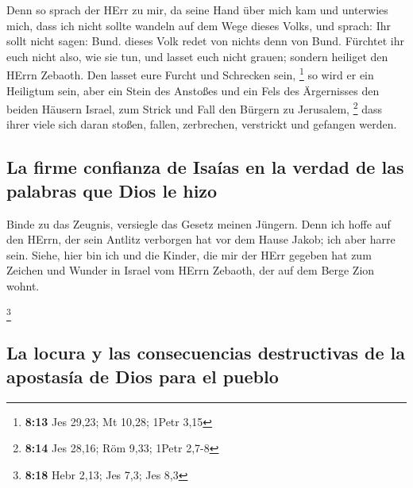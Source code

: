  Denn so sprach der HErr zu mir, da seine Hand über mich
kam und unterwies mich, dass ich nicht sollte wandeln auf dem Wege
dieses Volks, und sprach:  Ihr sollt nicht sagen: Bund.
dieses Volk redet von nichts denn von Bund. Fürchtet ihr euch nicht
also, wie sie tun, und lasset euch nicht grauen;  sondern
heiliget den HErrn Zebaoth. Den lasset eure Furcht und Schrecken sein,
\footnote{\textbf{8:13} Jes 29,23; Mt 10,28; 1Petr 3,15} 
so wird er ein Heiligtum sein, aber ein Stein des Anstoßes und ein Fels
des Ärgernisses den beiden Häusern Israel, zum Strick und Fall den
Bürgern zu Jerusalem, \footnote{\textbf{8:14} Jes 28,16; Röm 9,33; 1Petr
  2,7-8}  dass ihrer viele sich daran stoßen, fallen,
zerbrechen, verstrickt und gefangen werden.

\hypertarget{la-firme-confianza-de-isauxedas-en-la-verdad-de-las-palabras-que-dios-le-hizo}{%
\subsection{La firme confianza de Isaías en la verdad de las palabras
que Dios le
hizo}\label{la-firme-confianza-de-isauxedas-en-la-verdad-de-las-palabras-que-dios-le-hizo}}

 Binde zu das Zeugnis, versiegle das Gesetz meinen
Jüngern.  Denn ich hoffe auf den HErrn, der sein Antlitz
verborgen hat vor dem Hause Jakob; ich aber harre sein. 
Siehe, hier bin ich und die Kinder, die mir der HErr gegeben hat zum
Zeichen und Wunder in Israel vom HErrn Zebaoth, der auf dem Berge Zion
wohnt.

\footnote{\textbf{8:18} Hebr 2,13; Jes 7,3; Jes 8,3}

\hypertarget{la-locura-y-las-consecuencias-destructivas-de-la-apostasuxeda-de-dios-para-el-pueblo}{%
\subsection{La locura y las consecuencias destructivas de la apostasía
de Dios para el
pueblo}\label{la-locura-y-las-consecuencias-destructivas-de-la-apostasuxeda-de-dios-para-el-pueblo}}

